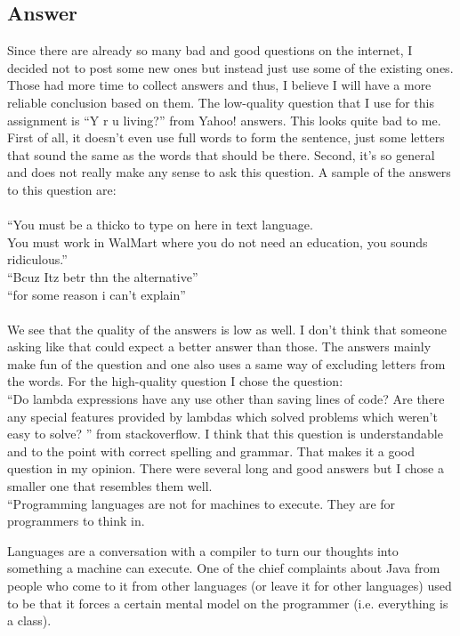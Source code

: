 \documentclass{article}
\begin{document}
\subsection*{Answer}
Since there are already so many bad and good questions on the internet, I decided not to post some new ones but instead just use some of the existing ones. Those had more time to collect answers and thus, I believe I will have a more reliable conclusion based on them. The low-quality question that I use for this assignment is  ``Y r u living?'' from Yahoo! answers. This looks quite bad to me. First of all, it doesn't even use full words to form the sentence, just some letters that sound the same as the words that should be there. Second, it's so general and does not really make any sense to ask this question. A sample of the answers to this question are:\\
\\``You must be a thicko to type on here in text language. \\You must work in WalMart where you do not need an education, you sounds ridiculous.''\\``Bcuz Itz betr thn the alternative''\\``for some reason i can't explain''\\
\\We see that the quality of the answers is low as well. I don't think that someone asking like that could expect a better answer than those. The answers mainly make fun of the question and one also uses a same way of excluding letters from the words. For the high-quality question I chose the question: \\``Do lambda expressions have any use other than saving lines of code?
Are there any special features provided by lambdas which solved problems which weren't easy to solve? '' from stackoverflow. I think that this question is understandable and to the point with correct spelling and grammar. That makes it a good question in my opinion. There were several long and good answers but I chose a smaller one that resembles them well.\\

``Programming languages are not for machines to execute. They are for programmers to think in.

Languages are a conversation with a compiler to turn our thoughts into something a machine can execute. One of the chief complaints about Java from people who come to it from other languages (or leave it for other languages) used to be that it forces a certain mental model on the programmer (i.e. everything is a class).
\end{document}
